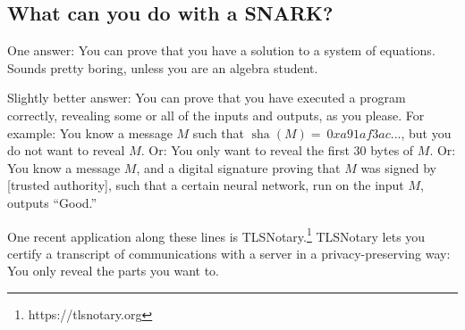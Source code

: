 \subsection{What can you do with a SNARK?}

One answer: You can prove that you have a solution to a system of
equations. Sounds pretty boring, unless you are an algebra student.

Slightly better answer: You can prove that you have executed a program
correctly, revealing some or all of the inputs and outputs, as you
please. For example: You know a message \(M\) such that
\(\operatorname{sha}(M) = \ 0xa91af3ac...\), but you do not want to
reveal \(M\). Or: You only want to reveal the first 30 bytes of \(M\).
Or: You know a message \(M\), and a digital signature proving that \(M\)
was signed by {[}trusted authority{]}, such that a certain neural
network, run on the input \(M\), outputs ``Good.''

One recent application along these lines is TLSNotary.\footnote{https://tlsnotary.org}
TLSNotary lets you certify a transcript of communications with a server
in a privacy-preserving way: You only reveal the parts you want to.
